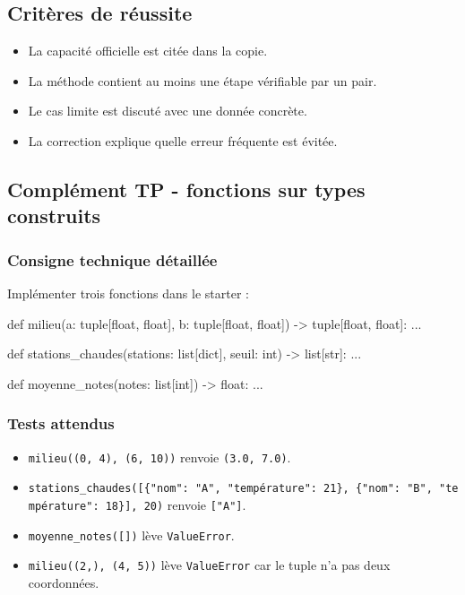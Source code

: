 \subsection{Critères de réussite}

\begin{itemize}
\tightlist
\item
  La capacité officielle est citée dans la copie.
\item
  La méthode contient au moins une étape vérifiable par un pair.
\item
  Le cas limite est discuté avec une donnée concrète.
\item
  La correction explique quelle erreur fréquente est évitée.
\end{itemize}

\subsection{Complément TP - fonctions sur types construits}

\subsubsection{Consigne technique détaillée}

Implémenter trois fonctions dans le starter :

\begin{python}
def milieu(a: tuple[float, float], b: tuple[float, float]) -> tuple[float, float]:
    ...

def stations_chaudes(stations: list[dict], seuil: int) -> list[str]:
    ...

def moyenne_notes(notes: list[int]) -> float:
    ...
\end{python}

\subsubsection{Tests attendus}

\begin{itemize}
\tightlist
\item
  \texttt{milieu((0,\ 4),\ (6,\ 10))} renvoie \texttt{(3.0,\ 7.0)}.
\item
  \texttt{stations\_chaudes({[}\{"nom":\ "A",\ "température":\ 21\},\ \{"nom":\ "B",\ "température":\ 18\}{]},\ 20)}
  renvoie \texttt{{[}"A"{]}}.
\item
  \texttt{moyenne\_notes({[}{]})} lève \texttt{ValueError}.
\item
  \texttt{milieu((2,),\ (4,\ 5))} lève \texttt{ValueError} car le tuple
  n'a pas deux coordonnées.
\end{itemize}

